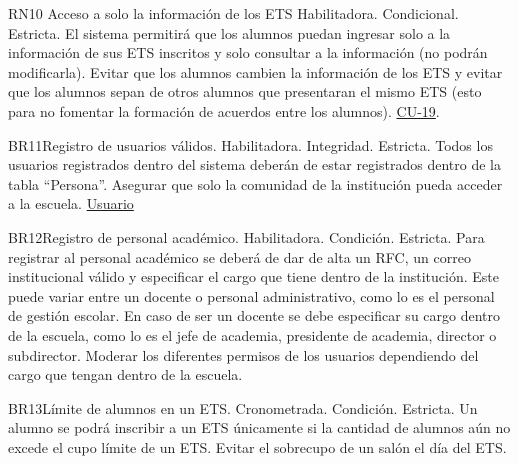 \begin{BussinesRule}{RN10} {Acceso a solo la información de los ETS }
    \BRitem[Tipo:]Habilitadora.
    \BRitem[Clase:]Condicional.
    \BRitem[Nivel:] Estricta.
    \BRitem[Descripción:] El sistema permitirá que los alumnos puedan ingresar solo a la información de sus ETS inscritos y solo consultar a la información (no podrán modificarla).
    \BRitem[Motivación:] Evitar que los alumnos cambien la información de los ETS y evitar que los alumnos sepan de otros alumnos que presentaran el mismo ETS (esto para no fomentar la formación de acuerdos entre los alumnos).
     \hyperlink{CU-19}{CU-19}.
    \end{BussinesRule}


\begin{BussinesRule}{BR11}{Registro de usuarios válidos.} 
    \BRitem[Tipo:] Habilitadora.
    \BRitem[Clase:] Integridad.
    \BRitem[Nivel:] Estricta.
    \BRitem[Descripción:] Todos los usuarios registrados dentro del sistema deberán de estar registrados dentro de la tabla “Persona”. 
    \BRitem[Motivación:] Asegurar que solo la comunidad de la institución pueda acceder a la escuela. 
     \hyperlink{Usuario}{Usuario} 
    \end{BussinesRule}

\begin{BussinesRule}{BR12}{Registro de personal académico.} 
    \BRitem[Tipo:] Habilitadora.
    \BRitem[Clase:] Condición.
    \BRitem[Nivel:] Estricta.
    \BRitem[Descripción:] Para registrar al personal académico se deberá de dar de alta un RFC, un correo institucional válido y especificar el cargo que tiene dentro de la institución. Este puede variar entre un docente o personal administrativo, como lo es el personal de gestión escolar. En caso de ser un docente se debe especificar su cargo dentro de la escuela, como lo es el jefe de academia, presidente de academia, director o subdirector. 
    \BRitem[Motivación:] Moderar los diferentes permisos de los usuarios dependiendo del cargo que tengan dentro de la escuela. 
     \hyperlink{}{} 
    \end{BussinesRule}

\begin{BussinesRule}{BR13}{Límite de alumnos en un ETS.} 
    \BRitem[Tipo:] Cronometrada. 
    \BRitem[Clase:] Condición.
    \BRitem[Nivel:] Estricta.
    \BRitem[Descripción:] Un alumno se podrá inscribir a un ETS únicamente si la cantidad de alumnos aún no excede el cupo límite de un ETS.
    \BRitem[Motivación:] Evitar el sobrecupo de un salón el día del ETS.
     \hyperlink{}{} 
    \end{BussinesRule}

